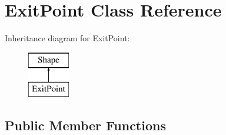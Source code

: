 \hypertarget{class_exit_point}{}\section{Exit\+Point Class Reference}
\label{class_exit_point}
Inheritance diagram for Exit\+Point\+:\begin{figure}[H]
\begin{center}
\leavevmode
\includegraphics[height=2.000000cm]{class_exit_point}
\end{center}
\end{figure}
\subsection*{Public Member Functions}
